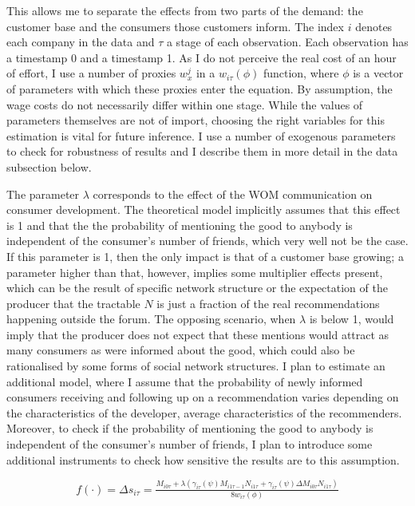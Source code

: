 \documentclass[13pt]{article}
\numberwithin{figure}{section}
\numberwithin{table}{section}
\theoremstyle{indented}
\numberwithin{equation}{section} %
\begin{document}
This allows me to separate the effects from two parts of the demand: the customer base and the consumers those customers inform. The index $i$ denotes each company in the data and $\tau$ a stage of each observation. Each observation has a timestamp 0 and a timestamp 1. As I do not perceive the real cost of an hour of effort, I use a number of proxies \textbf{$w_x^j$} in a $w_{i\tau}(\phi)$ function, where $\phi$ is a vector of parameters with which these proxies enter the equation. By assumption, the wage costs do not necessarily differ within one stage. While the values of parameters themselves are not of import, choosing the right variables for this estimation is vital for future inference. I use a number of exogenous parameters to check for robustness of results and I describe them in more detail in the data subsection below.

The parameter $\lambda$ corresponds to the effect of the WOM communication on consumer development. The theoretical model implicitly assumes that this effect is 1 and that the the probability of mentioning the good to anybody is independent of the consumer's number of friends, which very well not be the case. If this parameter is 1, then the only impact is that of a customer base growing; a parameter higher than that, however, implies some multiplier effects present, which can be the result of specific network structure or the expectation of the producer that the tractable $N$ is just a fraction of the real recommendations happening outside the forum. The opposing scenario, when $\lambda$ is below 1, would imply that the producer does not expect that these mentions would attract as many consumers as were informed about the good, which could also be rationalised by some forms of social network structures. I plan to estimate an additional model, where I assume that the probability of newly informed consumers receiving and following up on a recommendation varies depending on the characteristics of the developer, average characteristics of the recommenders. Moreover, to check if the probability of mentioning the good to anybody is independent of the consumer's number of friends, I plan to introduce some additional instruments to check how sensitive the results are to this assumption.

\begin{equation}
f(\cdot) = \Delta s_{i\tau} = \tfrac{M_{i0\tau} +\lambda( \gamma_{i\tau}(\psi) M_{i1\tau-1}N_{i1\tau} + \gamma_{i\tau}(\psi)\Delta M_{i0\tau}N_{i1\tau})}{8w_{i\tau}(\phi)}
\end{equation}
\end{document}
